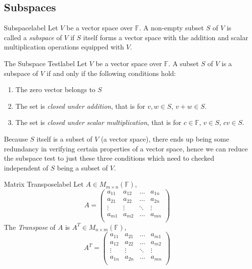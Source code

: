 \documentclass[12pt]{article}
\theoremstyle{definition}
\newcommand{\F}{\ensuremath{\mathbb{F}}}
\begin{document}
\subsection{Subspaces}
\begin{definition}{Subspace}{label}
   Let $V$ be a vector space over $\F$. A non-empty subset $S$ of $V$ is called a \emph{subspace} of $V$ if $S$ itself forms a vector space with the addition and scalar multiplication operations equipped with $V$. 
\end{definition}
\begin{lemma}{The Subspace Test}{label}
   Let $V$ be a vector space over $\F$. A subset $S$ of $V$ is a subspace of $V$ if and only if the following conditions hold:
   \begin{enumerate}
       \item The zero vector belongs to $S$
       \item The set is \emph{closed under addition}, that is for $v,w\in S$, $v + w\in S$.
       \item The set is \emph{closed under scalar multiplication}, that is for $c\in \F$, $v\in S$, $cv\in S$.
   \end{enumerate}
\end{lemma}
Because $S$ itself is a subset of $V$ (a vector space), there ends up being some redundancy in verifying certain properties of a vector space, hence we can reduce the subspace test to just these three conditions which need to checked independent of $S$ being a subset of $V$.

\begin{definition}{Matrix Transpose}{label}
    Let $A \in M_{m \times n}(\F)$, 
    $$A = \begin{pmatrix}
        a_{11} & a_{12}& \dots & a_{1n}\\
        a_{21} & a_{22}& \dots & a_{2n}\\
        \vdots & \vdots & \ddots & \vdots \\
        a_{m1} & a_{m2}& \dots & a_{mn}\\
    \end{pmatrix}$$
    The \emph{Transpose} of $A$ is $A^T\in M_{n\times m}(\F)$,
    $$A^T = \begin{pmatrix}
        a_{11} & a_{21}& \dots & a_{m1}\\
        a_{12} & a_{22}& \dots & a_{m2}\\
        \vdots & \vdots & \ddots & \vdots \\
        a_{1n} & a_{2n}& \dots & a_{mn}\\
    \end{pmatrix}$$
\end{definition}
\end{document}
